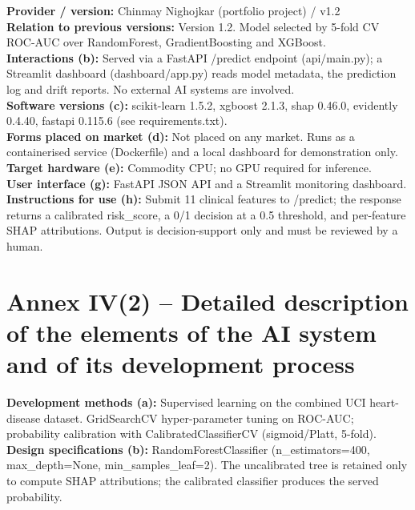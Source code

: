 \documentclass[11pt,a4paper]{article}
\begin{document}
\textbf{Provider / version:} Chinmay Nighojkar (portfolio project) / v1.2\\

\textbf{Relation to previous versions:} Version 1.2. Model selected by 5-fold CV ROC-AUC over RandomForest, GradientBoosting and XGBoost.\\

\textbf{Interactions (b):} Served via a FastAPI /predict endpoint (api/main.py); a Streamlit dashboard (dashboard/app.py) reads model metadata, the prediction log and drift reports. No external AI systems are involved.\\

\textbf{Software versions (c):} scikit-learn 1.5.2, xgboost 2.1.3, shap 0.46.0, evidently 0.4.40, fastapi 0.115.6 (see requirements.txt).\\

\textbf{Forms placed on market (d):} Not placed on any market. Runs as a containerised service (Dockerfile) and a local dashboard for demonstration only.\\

\textbf{Target hardware (e):} Commodity CPU; no GPU required for inference.\\

\textbf{User interface (g):} FastAPI JSON API and a Streamlit monitoring dashboard.\\

\textbf{Instructions for use (h):} Submit 11 clinical features to /predict; the response returns a calibrated risk\_score, a 0/1 decision at a 0.5 threshold, and per-feature SHAP attributions. Output is decision-support only and must be reviewed by a human.\\

\section*{Annex IV(2) -- Detailed description of the elements of the AI system and of its development process}
\textbf{Development methods (a):} Supervised learning on the combined UCI heart-disease dataset. GridSearchCV hyper-parameter tuning on ROC-AUC; probability calibration with CalibratedClassifierCV (sigmoid/Platt, 5-fold).\\

\textbf{Design specifications (b):} RandomForestClassifier (n\_estimators=400, max\_depth=None, min\_samples\_leaf=2). The uncalibrated tree is retained only to compute SHAP attributions; the calibrated classifier produces the served probability.\\
\end{document}
